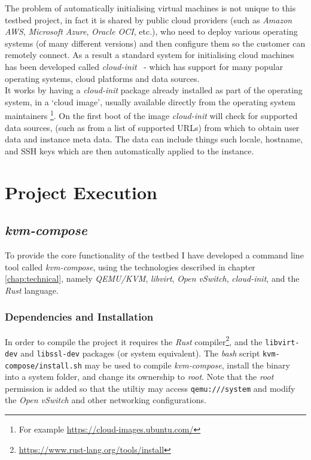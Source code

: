 \documentclass[
    author={Jacob Daniel Halsey},
    supervisor={Prof. Awais Rashid},
    degree={BSc},
    title={Building a Testbed for Evaluating Privacy Enhancing Technologies  (PETs)},
    subtitle={},
    type={software development},
    year={2021}
]{dissertation}
\begin{document}
The problem of automatically initialising virtual machines is not unique to this testbed project,
in fact it is shared by public cloud providers (such as \emph{Amazon AWS}, \emph{Microsoft Azure},
\emph{Oracle OCI}, etc.), who need to deploy various operating systems (of many different versions)
and then configure them so the customer can remotely connect.
As a result a standard system for initialising cloud machines has
been developed called \emph{cloud-init}~\cite{cloud_init} - which has support for many popular operating systems,
cloud platforms and data sources. \\

It works by having a \emph{cloud-init} package already installed as part of the operating system,
in a `cloud image', usually available directly from the operating system maintainers
\footnote{For example \url{https://cloud-images.ubuntu.com/}}.
On the first boot of the image \emph{cloud-init} will check for supported data sources,
(such as from a list of supported URLs) from which to obtain user data and instance meta data.
The data can include things such locale, hostname, and SSH keys which are then automatically
applied to the instance.

\chapter{Project Execution}
\label{chap:execution}

\section{\emph{kvm-compose}}

To provide the core functionality of the testbed I have developed a command line tool called \emph{kvm-compose},
using the technologies described in chapter \ref{chap:technical}, namely \emph{QEMU/KVM}, 
\emph{libvirt}, \emph{Open vSwitch}, \emph{cloud-init}, and the \emph{Rust} language.

\subsection{Dependencies and Installation}
\label{sect:dependencies}

In order to compile the project it requires the \emph{Rust} compiler\footnote{\url{https://www.rust-lang.org/tools/install}},
and the \texttt{libvirt-dev} and \texttt{libssl-dev} packages (or system equivalent).
The \emph{bash} script \texttt{kvm-compose/install.sh} may be used to compile \emph{kvm-compose},
install the binary into a system folder, and change its ownership to \emph{root}.
Note that the \emph{root} permission is added so that the utiltiy may access \texttt{qemu:///system}
and modify the \emph{Open vSwitch} and other networking configurations. \\
\end{document}
